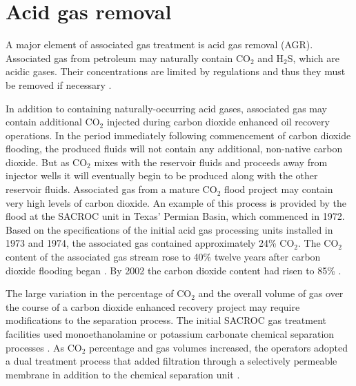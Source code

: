 \documentclass[11pt]{report}
\begin{document}
\begin{landscape}
\begin{tiny}
\begin{threeparttable}
\begin{supertabular*}{1\columnwidth}{p{0.03\columnwidth}p{0.3\columnwidth}p{0.25\columnwidth}p{0.05\columnwidth}p{0.05\columnwidth}p{0.05\columnwidth}p{0.05\columnwidth}p{0.025\columnwidth}}
\end{supertabular*}
\end{threeparttable}
\end{tiny}

\end{landscape}

\clearpage

\section{Acid gas removal}
\label{sec:AGR}

A major element of associated gas treatment is acid gas removal (AGR). Associated gas from petroleum may naturally contain CO$_{2}$ and H$_{2}$S, which are acidic gases. Their concentrations are limited by regulations and thus they must be removed if necessary \cite[p. 211-213]{FundNatGasProcessing}.



In addition to containing naturally-occurring acid gases, associated gas may contain additional CO$_{2}$ injected during carbon dioxide enhanced oil recovery operations. In the period immediately following commencement of carbon dioxide flooding, the produced fluids will not contain any additional, non-native carbon dioxide. But as CO$_{2}$ mixes with the reservoir fluids and proceeds away from injector wells it will eventually begin to be produced along with the other reservoir fluids. Associated gas from a mature CO$_{2}$ flood project may contain very high levels of carbon dioxide. An example of this process is provided by the flood at the SACROC unit in Texas' Permian Basin, which commenced in 1972. Based on the specifications of the initial acid gas processing units installed in 1973 and 1974, the associated gas contained approximately 24\% CO$_{2}$. The CO$_{2}$ content of the associated gas stream rose to 40\% twelve years after carbon dioxide flooding began \cite{Parro1984}. By 2002 the carbon dioxide content had risen to 85\% \cite{Guntis2002}.

The large variation in the percentage of CO$_{2}$ and the overall volume of gas over the course of a carbon dioxide enhanced recovery project may require modifications to the separation process. The initial SACROC gas treatment facilities used monoethanolamine or potassium carbonate chemical separation processes \cite{Guntis2002}. As CO$_{2}$ percentage and gas volumes increased, the operators adopted a dual treatment process that added filtration through a selectively permeable membrane in addition to the chemical separation unit \cite{Parro1984}.
\end{document}
